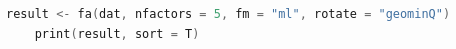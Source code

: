 \begin{lstlisting}[language=c++,label={code:10_03},caption={因子分析の実行}]
    result <- fa(dat, nfactors = 5, fm = "ml", rotate = "geominQ")
    print(result, sort = T)
\end{lstlisting}
